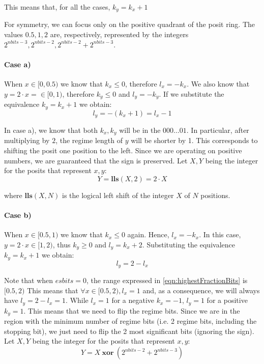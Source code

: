 This means that, for all the cases, $k_y = k_x + 1$

For symmetry, we can focus only on the positive quadrant of the posit ring. The values $0.5,1,2$ are, respectively, represented by the integers $2^{nbits - 3}, 2^{nbits - 2}, 2^{nbits - 2} + 2^{nbits - 3}$.

\paragraph{Case a)} When $x \in [0,0.5)$ we know that $k_x \leq 0$, therefore $l_x = -k_x$. We also know that $y = 2\cdot x = \in [0,1)$, therefore $k_y \leq 0$ and $l_y = -k_y$. If we substitute the equivalence  $k_y = k_x + 1$ we obtain:
\begin{equation}
    l_y = - (k_x + 1) = l_x - 1
\end{equation}


In case a), we know that both $k_x, k_y$ will be in the $000 \dots 01$. In particular, after multiplying by $2$, the regime length of $y$ will be shorter by 1. This corresponds to shifting the posit one position to the left. Since we are operating on positive numbers, we are guaranteed that the sign is preserved. Let $X,Y$ being the integer for the posits that represent $x,y$:
\begin{equation}
    Y = \mathbf{lls} (X,2) = 2 \cdot X
\end{equation}

where $\mathbf{lls}(X,N)$ is the logical left shift of the integer $X$ of $N$ positions.

\paragraph{Case b)} When $x \in [0.5,1)$ we know that $k_x \leq 0$ again. Hence, $l_x = -k_x$. In this case, $y = 2\cdot x \in [1,2)$, thus $k_y \geq 0$ and $l_y = k_x + 2$. Substituting the equivalence $k_y = k_x + 1$ we obtain:
\begin{equation}
    l_y = 2 - l_x
\end{equation}

Note that when $esbits = 0$, the range expressed in \eqref{eqn:highestFractionBits} is $[0.5,2)$ This means that $\forall x \in [0.5,2), l_x = 1$ and, as a consequence, we will always have $l_y = 2 - l_x = 1$. While $l_x = 1$ for a negative $k_x = -1$, $l_y = 1$ for a positive $k_y = 1$. This means that we need to flip the regime bits. Since we are in the region with the minimum number of regime bits (i.e. 2 regime bits, including the stopping bit), we just need to flip the 2 most significant bits (ignoring the sign). Let $X,Y$ being the integer for the posits that represent $x,y$:
\begin{equation}
    Y = X\ \mathbf{xor}\ (2^{nbits - 2} + 2^{nbits - 3})
\end{equation}


